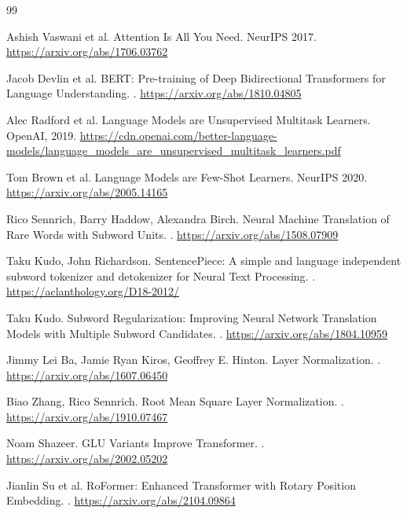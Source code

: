 \documentclass[UTF8,12pt]{ctexart}
\newcommand{\1}{\mathbf{1}}
\begin{document}
\newpage
\begin{thebibliography}{99}

Ashish Vaswani et al.
\newblock Attention Is All You Need.
\newblock NeurIPS 2017.
\newblock \url{https://arxiv.org/abs/1706.03762}

Jacob Devlin et al.
\newblock BERT: Pre-training of Deep Bidirectional Transformers for Language Understanding.
.
\newblock \url{https://arxiv.org/abs/1810.04805}

Alec Radford et al.
\newblock Language Models are Unsupervised Multitask Learners.
\newblock OpenAI, 2019.
\newblock \url{https://cdn.openai.com/better-language-models/language_models_are_unsupervised_multitask_learners.pdf}

Tom Brown et al.
\newblock Language Models are Few-Shot Learners.
\newblock NeurIPS 2020.
\newblock \url{https://arxiv.org/abs/2005.14165}

Rico Sennrich, Barry Haddow, Alexandra Birch.
\newblock Neural Machine Translation of Rare Words with Subword Units.
.
\newblock \url{https://arxiv.org/abs/1508.07909}

Taku Kudo, John Richardson.
\newblock SentencePiece: A simple and language independent subword tokenizer and detokenizer for Neural Text Processing.
.
\newblock \url{https://aclanthology.org/D18-2012/}

Taku Kudo.
\newblock Subword Regularization: Improving Neural Network Translation Models with Multiple Subword Candidates.
.
\newblock \url{https://arxiv.org/abs/1804.10959}

Jimmy Lei Ba, Jamie Ryan Kiros, Geoffrey E. Hinton.
\newblock Layer Normalization.
.
\newblock \url{https://arxiv.org/abs/1607.06450}

Biao Zhang, Rico Sennrich.
\newblock Root Mean Square Layer Normalization.
.
\newblock \url{https://arxiv.org/abs/1910.07467}

Noam Shazeer.
\newblock GLU Variants Improve Transformer.
.
\newblock \url{https://arxiv.org/abs/2002.05202}

Jianlin Su et al.
\newblock RoFormer: Enhanced Transformer with Rotary Position Embedding.
.
\newblock \url{https://arxiv.org/abs/2104.09864}


\end{thebibliography}
\end{document}
